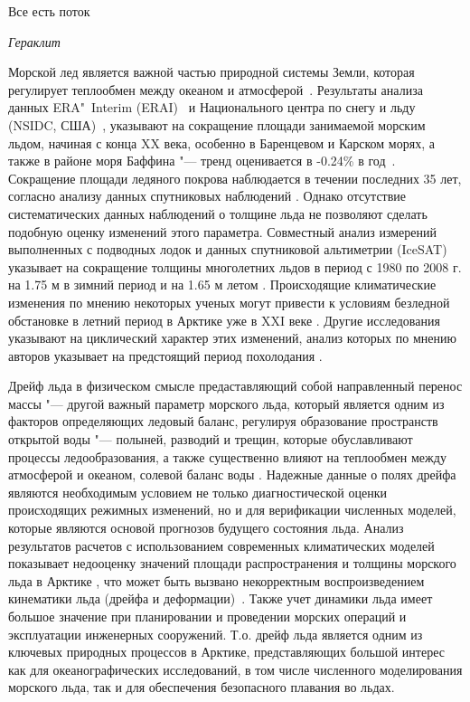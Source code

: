 
{\actuality} \epigraph{Все есть поток}{\textit{Гераклит}}
Морской лед является важной частью природной системы Земли, которая регулирует теплообмен между океаном и атмосферой~\cite{vaughan2013observations}. Результаты анализа данных ERA"~Interim (ERAI)~\cite{dee2011era} и Национального центра по снегу и льду (NSIDC, США)~\cite{cavalieri1996updated}, указывают на сокращение площади занимаемой морским льдом, начиная с конца XX века, особенно в Баренцевом и Карском морях, а также в районе моря Баффина "--- тренд оценивается в -0.24\% в год~\cite{park2015attribution}. Сокращение площади ледяного покрова наблюдается в течении последних 35 лет, согласно анализу данных спутниковых наблюдений \cite{simmonds2015comparing}. Однако отсутствие систематических данных наблюдений о толщине льда не позволяют сделать подобную оценку изменений этого параметра. Совместный анализ измерений выполненных с подводных лодок и данных спутниковой альтиметрии (IceSAT) указывает на сокращение толщины многолетних льдов в период с 1980 по 2008 г. на 1.75 м в зимний период и на 1.65 м летом \cite{rothrock2008decline,kwok2009thinning}. Происходящие климатические изменения по мнению некоторых ученых могут привести к условиям безледной обстановке в летний период в Арктике уже в XXI веке  \cite{stroeve2007arctic,wang2009sea,massonnet2012constraining,Laliber_2016,Jahn_2016}. Другие исследования указывают на циклический характер этих изменений, анализ которых по мнению авторов указывает на предстоящий период похолодания \cite{Frolov2010,Frolov2007_1,Frolov2007_2}.

Дрейф льда в физическом смысле предаставляющий собой направленный перенос массы "--- другой важный параметр морского льда, который является одним из факторов определяющих ледовый баланс, регулируя образование пространств открытой воды "--- полыней, разводий и трещин, которые обуславливают процессы ледообразования, а также существенно влияют на теплообмен между атмосферой и океаном, солевой баланс воды \cite{jordan1999heat,Makshtas1977}. Надежные данные о полях дрейфа являются необходимым условием не только диагностической оценки происходящих режимных изменений, но и для верификации численных моделей, которые являются основой прогнозов будущего состояния льда. Анализ результатов расчетов с использованием современных климатических  моделей показывает недооценку значений площади распространения и толщины морского льда в Арктике \cite{stroeve2007arctic}, что может быть вызвано некорректным воспроизведением кинематики льда (дрейфа и деформации)~\cite{rampal2011ipcc}. Также учет динамики льда имеет большое значение при планировании и проведении морских операций и эксплуатации инженерных сооружений. Т.о. дрейф льда является одним из ключевых природных процессов в Арктике, представляющих большой интерес как для океанографических исследований, в том числе численного моделирования морского льда, так и для обеспечения безопасного плавания во льдах.

